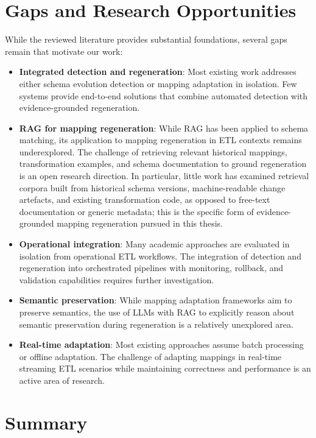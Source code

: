 \section{Gaps and Research Opportunities}
\label{sec:related-gaps}

While the reviewed literature provides substantial foundations, several gaps remain that motivate our work:

\begin{itemize}
  \item \textbf{Integrated detection and regeneration}: Most existing work addresses either schema evolution detection or mapping adaptation in isolation. Few systems provide end-to-end solutions that combine automated detection with evidence-grounded regeneration.
  \item \textbf{RAG for mapping regeneration}: While RAG has been applied to schema matching, its application to mapping regeneration in ETL contexts remains underexplored. The challenge of retrieving relevant historical mappings, transformation examples, and schema documentation to ground regeneration is an open research direction. In particular, little work has examined retrieval corpora built from historical schema versions, machine-readable change artefacts, and existing transformation code, as opposed to free-text documentation or generic metadata; this is the specific form of evidence-grounded mapping regeneration pursued in this thesis.
  \item \textbf{Operational integration}: Many academic approaches are evaluated in isolation from operational ETL workflows. The integration of detection and regeneration into orchestrated pipelines with monitoring, rollback, and validation capabilities requires further investigation.
  \item \textbf{Semantic preservation}: While mapping adaptation frameworks aim to preserve semantics, the use of LLMs with RAG to explicitly reason about semantic preservation during regeneration is a relatively unexplored area.
  \item \textbf{Real-time adaptation}: Most existing approaches assume batch processing or offline adaptation. The challenge of adapting mappings in real-time streaming ETL scenarios while maintaining correctness and performance is an active area of research.
\end{itemize}


\section{Summary}
\label{sec:related-summary}

